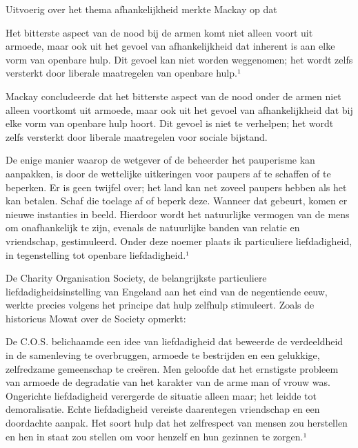 \documentclass[
  a5paper,
  smalldemyvopaper,10pt,twoside,onecolumn,openright,extrafontsizes,hidelinks]{memoir}
\renewenvironment{quote}%
               {\list{}{\rightmargin=.6cm\leftmargin=.6cm}%
                \itshape \item[]}%
               {\endlist}
\begin{document}
Uitvoerig over het thema afhankelijkheid merkte Mackay op dat

\begin{quote}
Het bitterste aspect van de nood bij de armen komt niet alleen voort uit
armoede, maar ook uit het gevoel van afhankelijkheid dat inherent is aan
elke vorm van openbare hulp. Dit gevoel kan niet worden weggenomen; het
wordt zelfs versterkt door liberale maatregelen van openbare hulp.¹
\end{quote}

Mackay concludeerde dat het bitterste aspect van de nood onder de armen
niet alleen voortkomt uit armoede, maar ook uit het gevoel van
afhankelijkheid dat bij elke vorm van openbare hulp hoort. Dit gevoel is
niet te verhelpen; het wordt zelfs versterkt door liberale maatregelen
voor sociale bijstand.

\begin{quote}
De enige manier waarop de wetgever of de beheerder het pauperisme kan
aanpakken, is door de wettelijke uitkeringen voor paupers af te schaffen
of te beperken. Er is geen twijfel over; het land kan net zoveel paupers
hebben als het kan betalen. Schaf die toelage af of beperk deze. Wanneer
dat gebeurt, komen er nieuwe instanties in beeld. Hierdoor wordt het
natuurlijke vermogen van de mens om onafhankelijk te zijn, evenals de
natuurlijke banden van relatie en vriendschap, gestimuleerd. Onder deze
noemer plaats ik particuliere liefdadigheid, in tegenstelling tot
openbare liefdadigheid.¹
\end{quote}

De Charity Organisation Society, de belangrijkste particuliere
liefdadigheidsinstelling van Engeland aan het eind van de negentiende
eeuw, werkte precies volgens het principe dat hulp zelfhulp stimuleert.
Zoals de historicus Mowat over de Society opmerkt:

\begin{quote}
De C.O.S. belichaamde een idee van liefdadigheid dat beweerde de
verdeeldheid in de samenleving te overbruggen, armoede te bestrijden en
een gelukkige, zelfredzame gemeenschap te creëren. Men geloofde dat het
ernstigste probleem van armoede de degradatie van het karakter van de
arme man of vrouw was. Ongerichte liefdadigheid verergerde de situatie
alleen maar; het leidde tot demoralisatie. Echte liefdadigheid vereiste
daarentegen vriendschap en een doordachte aanpak. Het soort hulp dat het
zelfrespect van mensen zou herstellen en hen in staat zou stellen om
voor henzelf en hun gezinnen te zorgen.¹
\end{quote}
\end{document}
